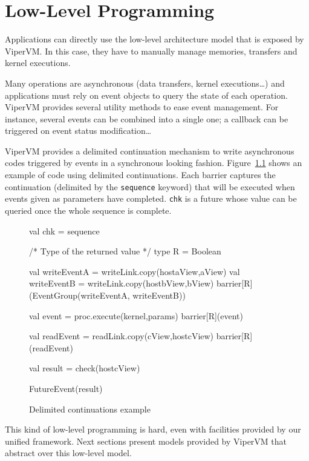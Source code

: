 \chapter{Low-Level Programming}

Applications can directly use the low-level architecture model that is exposed
by ViperVM. In this case, they have to manually manage memories, transfers and
kernel executions.

Many operations are asynchronous (data transfers, kernel executions\ldots) and
applications must rely on event objects to query the state of each operation.
ViperVM provides several utility methods to ease event management. For instance,
several events can be combined into a single one; a callback can be triggered on
event status modification\ldots

ViperVM provides a delimited continuation mechanism to write asynchronous codes
triggered by events in a synchronous looking fashion.
Figure~\ref{fig:continuations} shows an example of code using delimited
continuations. Each barrier captures the continuation (delimited by the
\texttt{sequence} keyword) that will be executed when events given as parameters
have completed. \texttt{chk} is a future whose value can be queried once the
whole sequence is complete.

\begin{figure}
\begin{scalacode}
val chk = sequence {
  /* Type of the returned value */
  type R = Boolean 

  val writeEventA = writeLink.copy(hostaView,aView)
  val writeEventB = writeLink.copy(hostbView,bView)
  barrier[R](EventGroup(writeEventA, writeEventB))

  val event = proc.execute(kernel,params)
  barrier[R](event)

  val readEvent = readLink.copy(cView,hostcView)
  barrier[R](readEvent)

  val result = check(hostcView)

  FutureEvent(result)
}
\end{scalacode}
  \caption{Delimited continuations example}
  \label{fig:continuations}
\end{figure}

This kind of low-level programming is hard, even with facilities provided by our
unified framework. Next sections present models provided by ViperVM that
abstract over this low-level model.
